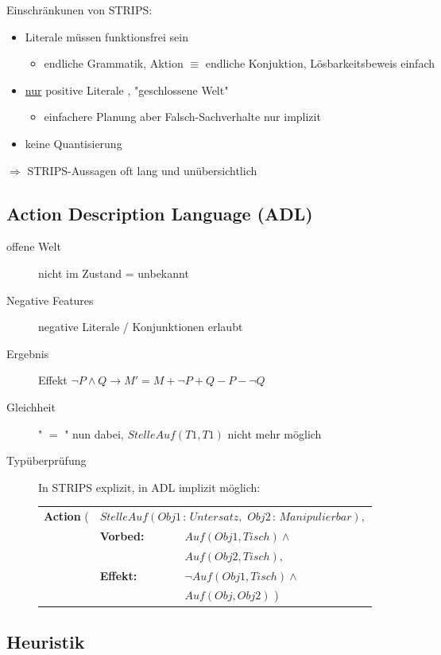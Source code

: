 Einschränkunen von STRIPS:
\begin{itemize}
\item Literale müssen funktionsfrei sein
\begin{itemize}
\item endliche Grammatik, Aktion $\equiv$ endliche Konjuktion, Lösbarkeitsbeweis einfach
\end{itemize}
\item \underline{nur} positive Literale , "{}geschlossene Welt"{}
\begin{itemize}
\item einfachere Planung aber Falsch-Sachverhalte nur implizit
\end{itemize}
\item keine Quantisierung
\end{itemize}
$\Rightarrow$ STRIPS-Aussagen oft lang und unübersichtlich

\subsection{Action Description Language (ADL)}

\begin{description}
	\item[offene Welt] nicht im Zustand = unbekannt
	\item[Negative Features] negative Literale / Konjunktionen erlaubt
	\item[Ergebnis] Effekt $\neg P \wedge Q \rightarrow M' = M + \neg P + Q - P - \neg Q$
	\item[Gleichheit] "{} $=$ "{} nun dabei, $\textit{StelleAuf}(T1,T1)$ nicht mehr möglich
	\item[Typüberprüfung] In STRIPS explizit, in ADL implizit möglich:
\begin{center}
\begin{tabular}{lll}
\textbf{Action} ( & \multicolumn{2}{l}{$StelleAuf(Obj1 \, : \, Untersatz, \,\, Obj2 \, : \, Manipulierbar),$} \\
& \textbf{Vorbed:} & $Auf(Obj1, Tisch) \wedge$ \\ && $Auf(Obj2, Tisch),$ \\
& \textbf{Effekt:} & $\neg Auf(Obj1, Tisch) \wedge$ \\ && $Auf(Obj, Obj2)$ \qquad \quad )
\end{tabular}
\end{center}
\end{description}

\subsection{Heuristik}

